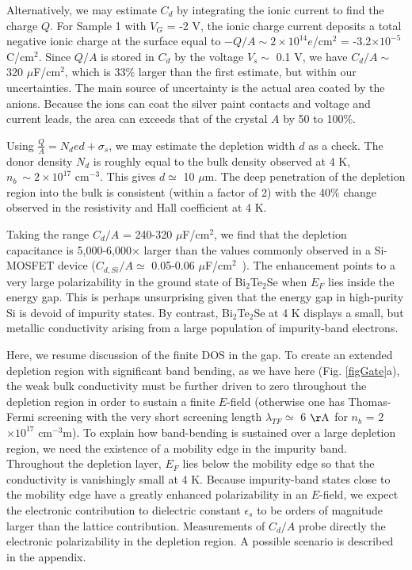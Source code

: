 Alternatively, we may estimate $C_d$ by integrating the ionic current to find the charge $Q$.
For Sample 1 with $V_G$ = -2 V, the ionic charge current deposits a total negative ionic charge at the surface equal to
$-Q/A\sim 2\times 10^{14}e$/cm$^2$ = -3.2$\times 10^{-5}$ C/cm$^2$. 
Since $Q/A$ is stored in $C_d$ by the voltage $V_s\sim$ 0.1 V,
we have $C_d/A\sim$ 320 $\mu$F/cm$^2$, which is 33$\%$ larger than the first estimate, but within our uncertainties.
The main source of uncertainty is the actual area coated by the anions. Because the ions can coat the silver paint
contacts and voltage and current leads, the area can exceeds that of the crystal $A$ by 50 to 100$\%$.

Using $\frac Q A = N_d e d + \sigma_s$, we may estimate the depletion width $d$ as a check.
The donor density $N_d$ is roughly equal to the bulk density observed at 4 K, $n_b~\sim 2\times 10^{17}$ cm$^{-3}$.
This gives $d\simeq$ 10 $\mu$m. The deep penetration of the depletion region into the bulk
is consistent (within a factor of 2) with the 40$\%$ change observed in the resistivity and Hall coefficient at 4 K.

Taking the range $C_d/A$ = 240-320 $\mu$F/cm$^2$, we find that 
the depletion capacitance is 5,000-6,000$\times$ larger
than the values commonly observed in a Si-MOSFET device ($C_{d,Si}/A\simeq$ 0.05-0.06 $\mu$F/cm$^2$~\cite{SternRMP,Sze}).
The enhancement points to a very large polarizability in the ground state of Bi$_2$Te$_2$Se
when $E_F$ lies inside the energy gap. This is perhaps unsurprising given that the 
energy gap in high-purity Si is devoid of impurity states. By contrast, 
Bi$_2$Te$_2$Se at 4 K displays a small, but metallic conductivity arising from a large population of impurity-band electrons.


Here, we resume discussion of the finite DOS in the gap.
To create an extended depletion region with significant band bending, as we have here (Fig. \ref{figGate}a), 
the weak bulk conductivity must be further driven to zero throughout the depletion region
in order to sustain a finite $E$-field (otherwise one has Thomas-Fermi screening with the very short screening length 
$\lambda_{TF} \simeq$ 6 $\rm\AA$
for $n_b$ = 2$\times 10^{17}$ cm$^{-3}$m). To explain how band-bending is sustained over a large depletion region,
we need the existence of a mobility edge in the 
impurity band. Throughout the depletion layer, $E_F$ lies below the mobility edge so that the
conductivity is vanishingly small at 4 K. Because impurity-band states close to the mobility edge 
have a greatly enhanced polarizability in an $E$-field, we expect the electronic contribution to 
dielectric constant $\epsilon_s$ to be orders of magnitude larger than the lattice contribution.
Measurements of $C_d/A$ probe directly the electronic polarizability in the depletion region. A
possible scenario is described in the appendix.

